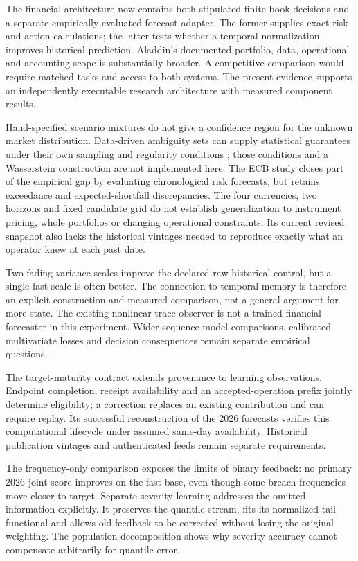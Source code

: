 \documentclass[11pt,a4paper]{article}
\theoremstyle{definition}\newtheorem{definition}[theorem]{Definition}
\begin{document}
The financial architecture now contains both stipulated finite-book decisions and a separate empirically evaluated forecast adapter. The former supplies exact risk and action calculations; the latter tests whether a temporal normalization improves historical prediction. Aladdin's documented portfolio, data, operational and accounting scope is substantially broader. A competitive comparison would require matched tasks and access to both systems. The present evidence supports an independently executable research architecture with measured component results.

Hand-specified scenario mixtures do not give a confidence region for the unknown market distribution. Data-driven ambiguity sets can supply statistical guarantees under their own sampling and regularity conditions \cite{esfahani2018dro}; those conditions and a Wasserstein construction are not implemented here. The ECB study closes part of the empirical gap by evaluating chronological risk forecasts, but retains exceedance and expected-shortfall discrepancies. The four currencies, two horizons and fixed candidate grid do not establish generalization to instrument pricing, whole portfolios or changing operational constraints. Its current revised snapshot also lacks the historical vintages needed to reproduce exactly what an operator knew at each past date.

Two fading variance scales improve the declared raw historical control, but a single fast scale is often better. The connection to temporal memory is therefore an explicit construction and measured comparison, not a general argument for more state. The existing nonlinear trace observer is not a trained financial forecaster in this experiment. Wider sequence-model comparisons, calibrated multivariate losses and decision consequences remain separate empirical questions.

The target-maturity contract extends provenance to learning observations. Endpoint completion, receipt availability and an accepted-operation prefix jointly determine eligibility; a correction replaces an existing contribution and can require replay. Its successful reconstruction of the 2026 forecasts verifies this computational lifecycle under assumed same-day availability. Historical publication vintages and authenticated feeds remain separate requirements.

The frequency-only comparison exposes the limits of binary feedback: no primary 2026 joint score improves on the fast base, even though some breach frequencies move closer to target. Separate severity learning addresses the omitted information explicitly. It preserves the quantile stream, fits its normalized tail functional and allows old feedback to be corrected without losing the original weighting. The population decomposition shows why severity accuracy cannot compensate arbitrarily for quantile error.
\end{document}
